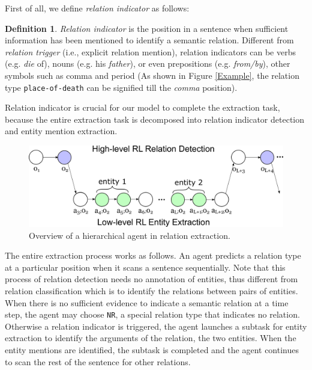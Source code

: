 \documentclass[letterpaper]{article}
\theoremstyle{definition}
\newtheorem{defn}{Definition}[]
\begin{document}
First of all, we define \textit{relation indicator} as follows:
\begin{defn}
    \textit{Relation indicator} is the position in a sentence when sufficient information has been mentioned to identify a semantic relation. Different from \textit{relation trigger} (i.e., explicit relation mention), relation indicators can be verbs (e.g. \textit{die} of), nouns (e.g. his \textit{father}), or even prepositions (e.g. \textit{from/by}), other symbols such as comma and period (As shown in Figure \ref{Example}, the relation type \texttt{place-of-death} can be signified till the {\it comma} position).
\label{define:relation_indicator}  %
\end{defn}
Relation indicator is crucial for our model to complete the extraction task, because the entire extraction task is decomposed into relation indicator detection and entity mention extraction.

\begin{figure}[!htp]
    \centering
    \includegraphics[width=\linewidth]{HRL.png}
    \caption{Overview of a hierarchical agent in relation extraction.} %
    \label{hierpolicy}
\end{figure}

The entire extraction process works as follows. An agent predicts a relation type at a particular position when it scans a sentence sequentially. Note that this process of relation detection needs no annotation of entities, thus different from relation classification which is to identify the relations between pairs of entities. When there is no sufficient evidence to indicate a semantic relation at a time step, the agent may choose \texttt{NR}, a special relation type that indicates no relation. Otherwise a relation indicator is triggered, the agent launches a subtask for entity extraction to identify the arguments of the relation, the two entities. When the entity mentions are identified, the subtask is completed and the agent continues to scan the rest of the sentence for other relations.
\end{document}
